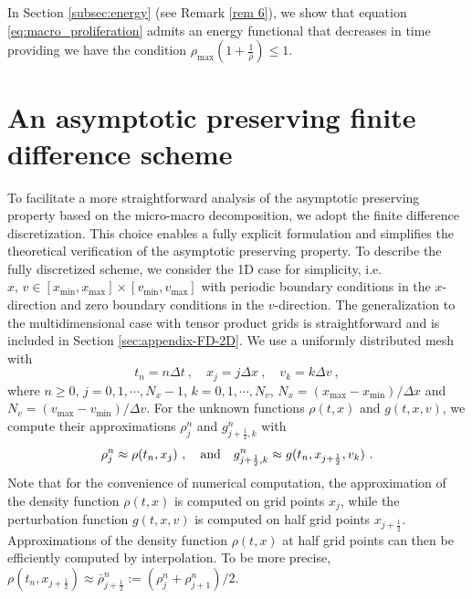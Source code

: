 \documentclass{aims} %
\theoremstyle{definition}
\newcommand {\dx}   {\Delta x}
\begin{document}
{In Section \ref{subsec:energy} (see Remark \ref{rem 6}), we show that equation \eqref{eq:macro_proliferation} admits an energy functional that decreases in time providing we have the condition $\rho_{\max} (1 + \frac{1}{\bar{\rho}}) \leq 1$}. 

\section{An asymptotic preserving finite difference scheme}\label{sec: implicit-explicit scheme}
To facilitate a more straightforward analysis of the asymptotic preserving property based on the micro-macro decomposition, we adopt the finite difference discretization. This choice enables a fully explicit formulation and simplifies the theoretical verification of the asymptotic preserving property.
To describe the fully discretized scheme, we consider the 1D case for simplicity, i.e. {$x, \,v \in [x_{\min}, x_{\max}]\times [v_{\min}, v_{\max}]$ with periodic boundary conditions in the $x$-direction and zero boundary conditions in the $v$-direction.} The generalization to
the multidimensional case with tensor product grids is straightforward and is included in  Section \ref{sec:appendix-FD-2D}. We use a uniformly distributed mesh with 
\begin{equation*}
    t_n = n \Delta t\ , \quad x_j = j \dx\ , \quad v_k = k \Delta v\  ,
\end{equation*}
where $n\ge0$, $j=0,1,\cdots, N_x-1$, $k=0,1,\cdots, N_v$, $N_x = (x_{\max} - x_{\min}) / \Delta x$ and $N_v = (v_{\max} - v_{\min}) / \Delta v$. 
For the unknown functions $\rho(t,x)$ and $g(t,x,v)$, we compute {{their}} approximations $\rho_j^n$ and $g^n_{j+\frac{1}{2},k}$ with 
\begin{equation*}
  \rho_j^n\approx\rho(t_n,x_j)\ ,\quad\textnormal{and} \quad  
  g^n_{j+\frac{1}{2},k}\approx g(t_n,x_{j+\frac{1}{2}},v_k)\ . 
\end{equation*}
Note that for the convenience of numerical computation, the approximation of the density function $\rho(t,x)$ is computed on grid points $x_j$, while the perturbation function $g(t,x,v)$ is computed on half grid points $x_{j+\frac12}$. 
Approximations of the density function $\rho(t,x)$ at half grid points can then be  efficiently computed by interpolation. 
To be more precise,  $\rho(t_n,x_{j+\frac12}) \approx \bar{\rho}_{j+\frac12}^n:=(\rho_j^n + \rho_{j+1}^n)/2$. 
\end{document}
